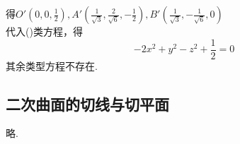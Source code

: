 \documentclass[UTF8]{ctexart}
\begin{document}
\begin{enumerate}
得$O'(0,0,\displaystyle\frac{1}{2}),A'(\displaystyle\frac{1}{\sqrt{3}},\displaystyle\frac{2}{\sqrt{6}},\displaystyle-\frac{1}{2}),B'(\displaystyle\frac{1}{\sqrt{3}},\displaystyle-\frac{1}{\sqrt{6}},0)$\\
代入(\uppercase\expandafter{})类方程，得$$-2x^2+y^2-z^2+\displaystyle\frac{1}{2}=0$$
其余类型方程不存在.
\end{enumerate}

\subsection{二次曲面的切线与切平面}
略.


\end{document}
